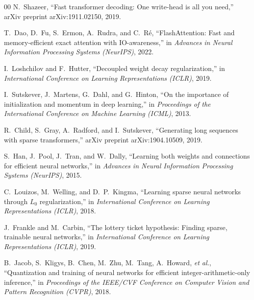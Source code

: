 \documentclass[conference]{IEEEtran}
\begin{document}
\begin{thebibliography}{00}
N.~Shazeer, ``Fast transformer decoding: One write-head is all you need,'' arXiv preprint arXiv:1911.02150, 2019.

T.~Dao, D.~Fu, S.~Ermon, A.~Rudra, and C.~R\'{e}, ``FlashAttention: Fast and memory-efficient exact attention with IO-awareness,'' in \emph{Advances in Neural Information Processing Systems (NeurIPS)}, 2022.

I.~Loshchilov and F.~Hutter, ``Decoupled weight decay regularization,'' in \emph{International Conference on Learning Representations (ICLR)}, 2019.

I.~Sutskever, J.~Martens, G.~Dahl, and G.~Hinton, ``On the importance of initialization and momentum in deep learning,'' in \emph{Proceedings of the International Conference on Machine Learning (ICML)}, 2013.

R.~Child, S.~Gray, A.~Radford, and I.~Sutskever, ``Generating long sequences with sparse transformers,'' arXiv preprint arXiv:1904.10509, 2019.

S.~Han, J.~Pool, J.~Tran, and W.~Dally, ``Learning both weights and connections for efficient neural networks,'' in \emph{Advances in Neural Information Processing Systems (NeurIPS)}, 2015.

C.~Louizos, M.~Welling, and D.~P.~Kingma, ``Learning sparse neural networks through $L_0$ regularization,'' in \emph{International Conference on Learning Representations (ICLR)}, 2018.

J.~Frankle and M.~Carbin, ``The lottery ticket hypothesis: Finding sparse, trainable neural networks,'' in \emph{International Conference on Learning Representations (ICLR)}, 2019.

B.~Jacob, S.~Kligys, B.~Chen, M.~Zhu, M.~Tang, A.~Howard, \emph{et al.}, ``Quantization and training of neural networks for efficient integer-arithmetic-only inference,'' in \emph{Proceedings of the IEEE/CVF Conference on Computer Vision and Pattern Recognition (CVPR)}, 2018.

\end{thebibliography}
\end{document}
